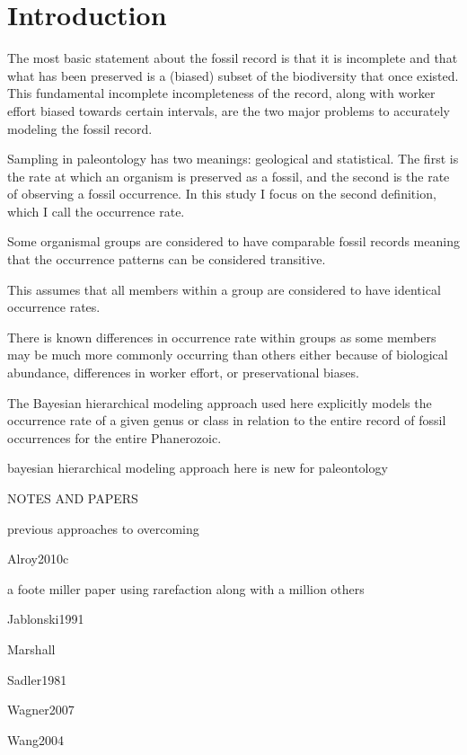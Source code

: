 \documentclass[12pt,letterpaper]{article}
\begin{document}
\section{Introduction}

The most basic statement about the fossil record is that it is incomplete and that what has been preserved is a (biased) subset of the biodiversity that once existed. This fundamental incomplete incompleteness of the record, along with worker effort biased towards certain intervals, are the two major problems to accurately modeling the fossil record.


Sampling in paleontology has two meanings: geological and statistical. The first is the rate at which an organism is preserved as a fossil, and the second is the rate of observing a fossil occurrence. In this study I focus on the second definition, which I call the occurrence rate.



Some organismal groups are considered to have comparable fossil records meaning that the occurrence patterns can be considered transitive.

This assumes that all members within a group are considered to have identical occurrence rates.

There is known differences in occurrence rate within groups as some members may be much more commonly occurring than others either because of biological abundance, differences in worker effort, or preservational biases.


The Bayesian hierarchical modeling approach used here explicitly models the occurrence rate of a given genus or class in relation to the entire record of fossil occurrences for the entire Phanerozoic. 




bayesian hierarchical modeling approach here is new for paleontology



\uppercase{notes and papers}

previous approaches to overcoming

Alroy2010c %

a foote miller paper using rarefaction along with a million others

Jablonski1991 %

Marshall %

Sadler1981

Wagner2007

Wang2004
\end{document}
